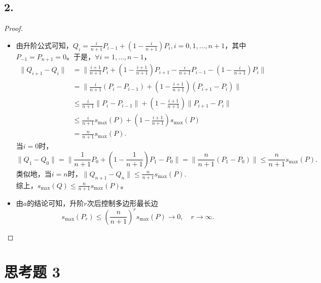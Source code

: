 \documentclass[utf8]{ctexart}
\begin{document}
\subsection*{2.}
\begin{proof}
    \begin{itemize}
        \item %
        由升阶公式可知，$Q_{i} = \frac{i}{n+1}P_{i-1} + (1-\frac{i}{n+1})P_i,i=0,1,\dots,n+1$，其中$P_{-1}=P_{n+1}=0$。于是，$\forall i = 1,\dots,n-1$，
        $$
        \begin{aligned}
        \|Q_{i+1} - Q_i\| &= \|\frac{i+1}{n+1}P_i + (1-\frac{i+1}{n+1})P_{i+1} - \frac{i}{n+1}P_{i-1} - (1-\frac{i}{n+1})P_{i}\|\\
        &= \|\frac{i}{n+1}(P_i-P_{i-1}) + (1-\frac{i+1}{n+1})(P_{i+1}-P_i)\|\\
        &\leq \frac{i}{n+1}\|P_i-P_{i-1}\| + (1-\frac{i+1}{n+1})\|P_{i+1}-P_i\|\\
        &\leq \frac{i}{n+1} s_{\max}(P) + (1-\frac{i+1}{n+1})s_{\max}(P)\\
        &= \frac{n}{n+1} s_{\max}(P).
        \end{aligned}
        $$
        当$i=0$时，
        $$
        \|Q_1-Q_0\| = \|\frac{1}{n+1}P_0  + (1-\frac{1}{n+1})P_1 - P_0\| = \|\frac{n}{n+1}(P_1 - P_0)\| \leq \frac{n}{n+1}s_{\max}(P).
        $$
        类似地，当$i=n$时，$\|Q_{n+1}-Q_n\| \leq \frac{n}{n+1}s_{\max}(P)$.\\
        综上，$s_{\max}(Q)\leq \frac{n}{n+1}s_{\max}(P)$。
        \item %
        由$a$的结论可知，升阶$r$次后控制多边形最长边
        $$
        s_{\max}(P_r) \leq (\frac{n}{n+1})^r s_{\max}(P) \to 0, \quad r \to \infty.
        $$
    \end{itemize}
\end{proof}

\section*{思考题 3}
\end{document}
